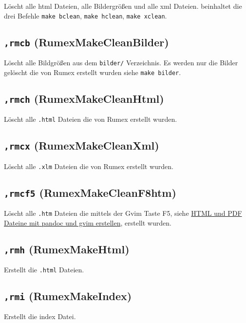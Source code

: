 Löscht alle html Dateien, alle Bildergrößen und alle xml Dateien.
beinhaltet die drei Befehle \texttt{make bclean}, \texttt{make hclean},
\texttt{make xclean}.

\subsection{\texttt{,rmcb}
(RumexMakeCleanBilder)}\label{rmcb-rumexmakecleanbilder}

Löscht alle Bildgrößen aus dem \texttt{bilder/} Verzeichnis. Es werden
nur die Bilder gelöscht die von Rumex erstellt wurden siehe
\texttt{make bilder}.

\subsection{\texttt{,rmch}
(RumexMakeCleanHtml)}\label{rmch-rumexmakecleanhtml}

Löscht alle \texttt{.html} Dateien die von Rumex erstellt wurden.

\subsection{\texttt{,rmcx}
(RumexMakeCleanXml)}\label{rmcx-rumexmakecleanxml}

Löscht alle \texttt{.xlm} Dateien die von Rumex erstellt wurden.

\subsection{\texttt{,rmcf5}
(RumexMakeCleanF8htm)}\label{rmcf5-rumexmakecleanf8htm}

Löscht alle \texttt{.htm} Dateien die mittels der Gvim Taste F5, siehe
\href{http://www.it-bayer.de/rumex/statik/index.htm}{HTML und PDF
Dateine mit pandoc und gvim erstellen}, erstellt wurden.

\subsection{\texttt{,rmh} (RumexMakeHtml)}\label{rmh-rumexmakehtml}

Erstellt die \texttt{.html} Dateien.

\subsection{\texttt{,rmi} (RumexMakeIndex)}\label{rmi-rumexmakeindex}

Erstellt die index Datei.

